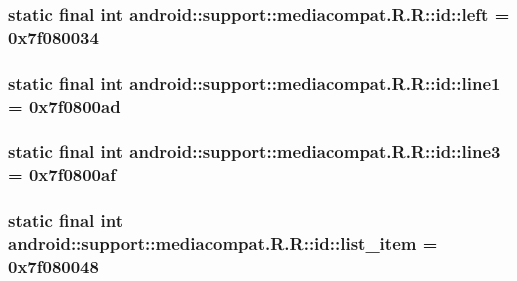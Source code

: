 \hypertarget{classandroid_1_1support_1_1mediacompat_1_1_r_1_1id_b8cdbf4b1743782137cc16ae39960a07}{
\subsubsection[{left}]{\setlength{\rightskip}{0pt plus 5cm}static final int android::support::mediacompat.R.R::id::left = 0x7f080034}}
\label{classandroid_1_1support_1_1mediacompat_1_1_r_1_1id_b8cdbf4b1743782137cc16ae39960a07}


\hypertarget{classandroid_1_1support_1_1mediacompat_1_1_r_1_1id_480802c74b278ad9a77601f02a6d001b}{
\subsubsection[{line1}]{\setlength{\rightskip}{0pt plus 5cm}static final int android::support::mediacompat.R.R::id::line1 = 0x7f0800ad}}
\label{classandroid_1_1support_1_1mediacompat_1_1_r_1_1id_480802c74b278ad9a77601f02a6d001b}


\hypertarget{classandroid_1_1support_1_1mediacompat_1_1_r_1_1id_42cdb76f4f8ba549447e831c33a50479}{
\subsubsection[{line3}]{\setlength{\rightskip}{0pt plus 5cm}static final int android::support::mediacompat.R.R::id::line3 = 0x7f0800af}}
\label{classandroid_1_1support_1_1mediacompat_1_1_r_1_1id_42cdb76f4f8ba549447e831c33a50479}


\hypertarget{classandroid_1_1support_1_1mediacompat_1_1_r_1_1id_1e7b3c7b52e31d33f8f84c07483dde67}{
\subsubsection[{list\_\-item}]{\setlength{\rightskip}{0pt plus 5cm}static final int android::support::mediacompat.R.R::id::list\_\-item = 0x7f080048}}
\label{classandroid_1_1support_1_1mediacompat_1_1_r_1_1id_1e7b3c7b52e31d33f8f84c07483dde67}


